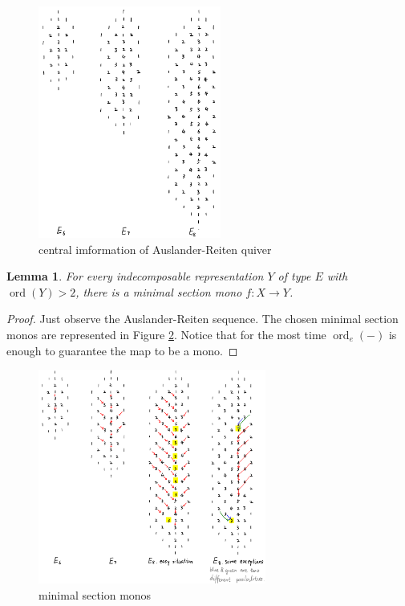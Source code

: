 \documentclass[reqno,11pt]{amsart}
\numberwithin{equation}{section}
\theoremstyle{plain}
\newtheorem{lemma}[theorem]{Lemma}
\theoremstyle{plain}
\numberwithin{equation}{section}
\theoremstyle{remark}
\newcommand{\ord}{\operatorname{ord}}
\newcommand{\orde}{\operatorname{ord}_e }
\begin{document}
\begin{center}
	\begin{figure}[ht]
		\vspace{0cm}
		\centering
		\includegraphics[width=6cm]{figures/startingfunction.png}
		\caption{central imformation of Auslander-Reiten quiver}
		\label{fig:startingfunction}
	\end{figure}
\end{center}

\begin{lemma}
	For every indecomposable representation $Y$ of type $E$ with $\ord(Y)>2$, there is a minimal section mono $f:X \longrightarrow Y$.
\end{lemma}
\begin{proof}
	Just observe the Auslander-Reiten sequence. The chosen minimal section monos are represented in Figure \ref{fig:minisecmono}. Notice that for the most time $\orde(-)$ is enough to guarantee the map to be a mono.
\end{proof}
	\begin{center}
		\begin{figure}[ht]
			\vspace{0cm}
			\centering
			\includegraphics[width=7.5cm]{figures/minisecmono.png}
			\caption{minimal section monos}
			\label{fig:minisecmono}
			\vspace{0.2cm}
		\end{figure}
	\end{center}
	
\end{document}
